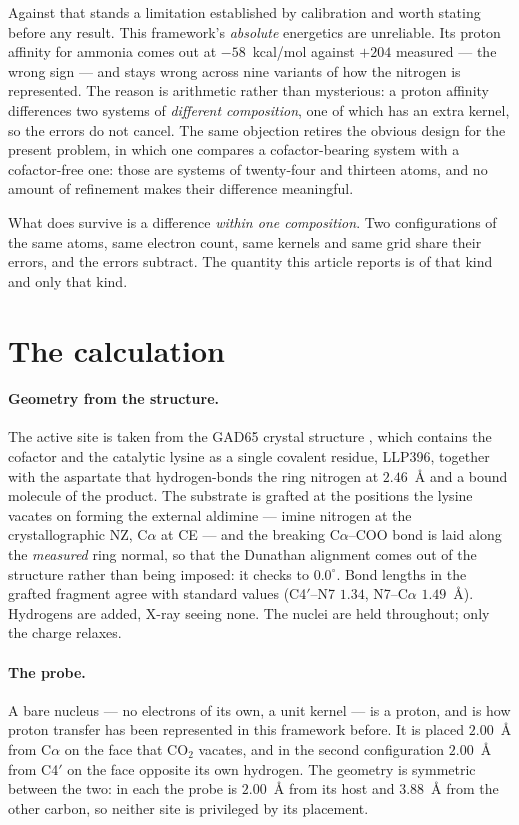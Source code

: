 \documentclass[11pt]{article}
\newcommand{\Ca}{C\ensuremath{\alpha}}
\newcommand{\Cfp}{C4\ensuremath{'}}
\begin{document}
Against that stands a limitation established by calibration and worth stating before any result.
This framework's \emph{absolute} energetics are unreliable. Its proton affinity for ammonia comes
out at $-58$~kcal/mol against $+204$ measured --- the wrong sign --- and stays wrong across nine
variants of how the nitrogen is represented. The reason is arithmetic rather than mysterious: a
proton affinity differences two systems of \emph{different composition}, one of which has an extra
kernel, so the errors do not cancel. The same objection retires the obvious design for the present
problem, in which one compares a cofactor-bearing system with a cofactor-free one: those are systems
of twenty-four and thirteen atoms, and no amount of refinement makes their difference meaningful.

What does survive is a difference \emph{within one composition}. Two configurations of the same
atoms, same electron count, same kernels and same grid share their errors, and the errors subtract.
The quantity this article reports is of that kind and only that kind.

\section{The calculation}

\paragraph{Geometry from the structure.} The active site is taken from the GAD65 crystal structure
\cite{fenalti}, which contains the cofactor and the catalytic lysine as a single covalent residue,
LLP396, together with the aspartate that hydrogen-bonds the ring nitrogen at $2.46$~\AA{} and a bound
molecule of the product. The substrate is grafted at the positions the lysine vacates on forming the
external aldimine --- imine nitrogen at the crystallographic NZ, \Ca{} at CE --- and the breaking
\Ca--COO bond is laid along the \emph{measured} ring normal, so that the Dunathan alignment comes out
of the structure rather than being imposed: it checks to $0.0^\circ$. Bond lengths in the grafted
fragment agree with standard values (C4$'$--N7 $1.34$, N7--\Ca{} $1.49$~\AA). Hydrogens are added,
X-ray seeing none. The nuclei are held throughout; only the charge relaxes.

\paragraph{The probe.} A bare nucleus --- no electrons of its own, a unit kernel --- is a proton, and
is how proton transfer has been represented in this framework before. It is placed $2.00$~\AA{} from
\Ca{} on the face that CO$_2$ vacates, and in the second configuration $2.00$~\AA{} from \Cfp{} on
the face opposite its own hydrogen. The geometry is symmetric between the two: in each the probe is
$2.00$~\AA{} from its host and $3.88$~\AA{} from the other carbon, so neither site is privileged by
its placement.
\end{document}
